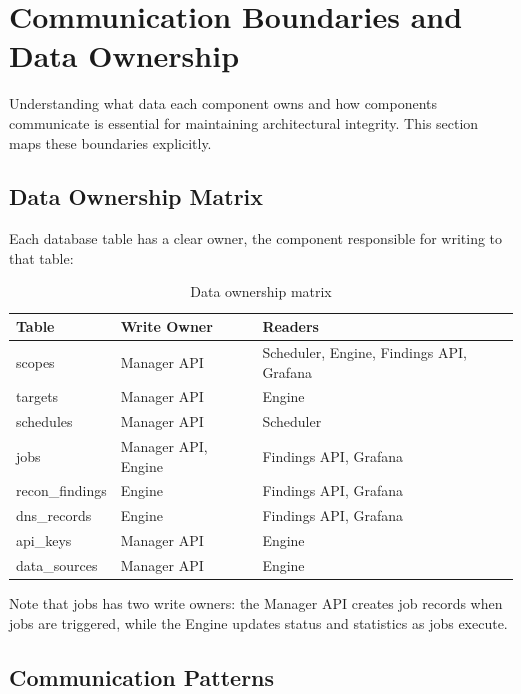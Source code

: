 \documentclass[a4paper,12pt]{report}
\begin{document}
\section{Communication Boundaries and Data Ownership}

Understanding what data each component owns and how components communicate is essential for maintaining architectural integrity. This section maps these boundaries explicitly.

\subsection{Data Ownership Matrix}

Each database table has a clear owner, the component responsible for writing to that table:\hfill \break

\begin{table}[H]
\centering
\caption{Data ownership matrix}
\begin{tabular}{|l|l|l|}
\hline
\textbf{Table} & \textbf{Write Owner} & \textbf{Readers} \\
\hline
scopes & Manager API & Scheduler, Engine, Findings API, Grafana \\
\hline
targets & Manager API & Engine \\
\hline
schedules & Manager API & Scheduler \\
\hline
jobs & Manager API, Engine & Findings API, Grafana \\
\hline
recon\_findings & Engine & Findings API, Grafana \\
\hline
dns\_records & Engine & Findings API, Grafana \\
\hline
api\_keys & Manager API & Engine \\
\hline
data\_sources & Manager API & Engine \\
\hline
\end{tabular}
\label{tab:data_ownership}
\end{table}

Note that jobs has two write owners: the Manager API creates job records when jobs are triggered, while the Engine updates status and statistics as jobs execute.\hfill \break

\subsection{Communication Patterns}
\end{document}
